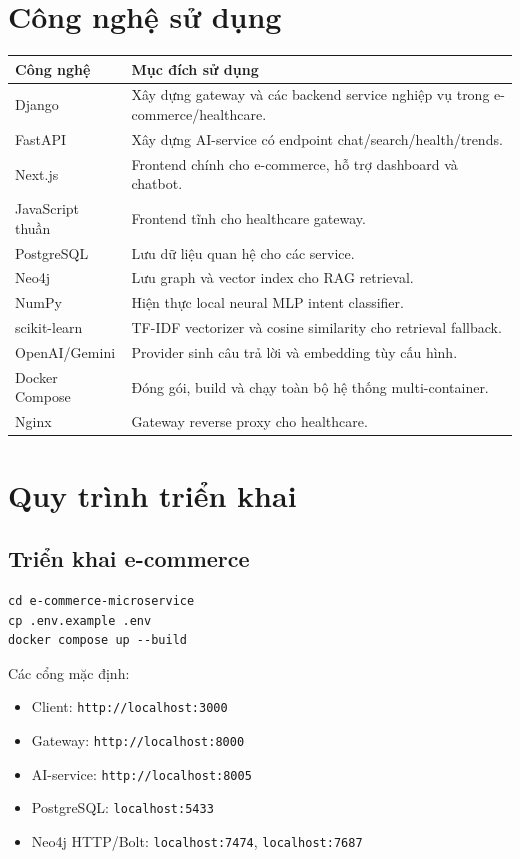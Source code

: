 \documentclass[12pt,a4paper]{report}
\begin{document}
\section{Công nghệ sử dụng}
\begin{longtable}{p{3.4cm}p{10cm}}
\toprule
\textbf{Công nghệ} & \textbf{Mục đích sử dụng} \\
\midrule
Django & Xây dựng gateway và các backend service nghiệp vụ trong e-commerce/healthcare. \\
FastAPI & Xây dựng AI-service có endpoint chat/search/health/trends. \\
Next.js & Frontend chính cho e-commerce, hỗ trợ dashboard và chatbot. \\
JavaScript thuần & Frontend tĩnh cho healthcare gateway. \\
PostgreSQL & Lưu dữ liệu quan hệ cho các service. \\
Neo4j & Lưu graph và vector index cho RAG retrieval. \\
NumPy & Hiện thực local neural MLP intent classifier. \\
scikit-learn & TF-IDF vectorizer và cosine similarity cho retrieval fallback. \\
OpenAI/Gemini & Provider sinh câu trả lời và embedding tùy cấu hình. \\
Docker Compose & Đóng gói, build và chạy toàn bộ hệ thống multi-container. \\
Nginx & Gateway reverse proxy cho healthcare. \\
\bottomrule
\end{longtable}

\section{Quy trình triển khai}
\subsection{Triển khai e-commerce}
\begin{lstlisting}[style=code,caption={Chạy e-commerce}]
cd e-commerce-microservice
cp .env.example .env
docker compose up --build
\end{lstlisting}

Các cổng mặc định:
\begin{itemize}
  \item Client: \texttt{http://localhost:3000}
  \item Gateway: \texttt{http://localhost:8000}
  \item AI-service: \texttt{http://localhost:8005}
  \item PostgreSQL: \texttt{localhost:5433}
  \item Neo4j HTTP/Bolt: \texttt{localhost:7474}, \texttt{localhost:7687}
\end{itemize}
\end{document}
